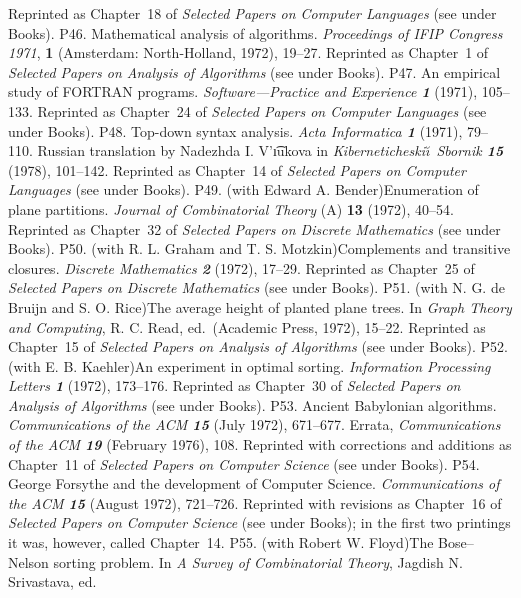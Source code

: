  Reprinted as Chapter~18 of {\sl Selected Papers on
 Computer Languages\/} (see under Books).
\p P46.  Mathematical analysis of algorithms.  {\sl Proceedings of
 IFIP Congress 1971}, {\bf 1} (Amsterdam: North-Holland, 1972), 19--27.
 Reprinted as Chapter~1 of {\sl Selected Papers on Analysis of Algorithms\/}
 (see under Books).
\p P47.  An empirical study of FORTRAN programs.  {\sl Software---Practice
 and Experience\/ \bf 1} (1971), 105--133.  
 Reprinted as Chapter~24 of {\sl Selected Papers on
 Computer Languages\/} (see under Books).
\p P48.  Top-down syntax analysis.  {\sl Acta Informatica\/ \bf 1}
 (1971), 79--110.  Russian translation by Nadezhda I. V'\t\i ukova in
 {\sl Kiberneticheski\u\i\ Sbornik\/ \bf 15} (1978), 101--142.
 Reprinted as Chapter~14 of {\sl Selected Papers on
 Computer Languages\/} (see under Books).
\p P49.  (with Edward A. Bender)\xskip  Enumeration of plane partitions.
  {\sl Journal of Combinatorial Theory\/} (A) {\bf 13} (1972), 40--54.  
 Reprinted as Chapter~32 of {\sl Selected Papers on
 Discrete Mathematics\/} (see under Books).
\p P50.  (with R. L. Graham and T. S. Motzkin)\xskip  Complements and
 transitive closures.  {\sl Discrete Mathematics\/ \bf 2} (1972), 17--29.  
 Reprinted as Chapter~25 of {\sl Selected Papers on
 Discrete Mathematics\/} (see under Books).
\p P51.  (with N. G. de Bruijn and S. O. Rice)\xskip  The average height
 of planted plane trees.  In {\sl Graph Theory and Computing}, R. C. Read,
 ed.\ (Academic Press, 1972), 15--22.  
 Reprinted as Chapter~15 of {\sl Selected Papers on Analysis of Algorithms\/}
 (see under Books).
\p P52.  (with E. B. Kaehler)\xskip  An experiment in optimal sorting.
 {\sl Information Processing Letters\/ \bf 1} (1972), 173--176.
 Reprinted as Chapter~30 of {\sl Selected Papers on Analysis of Algorithms\/}
 (see under Books).
\p P53.  Ancient Babylonian algorithms.  {\sl Commun\-i\-ca\-tions of the
 ACM\/ \bf 15} (July 1972), 671--677.
 Errata, {\sl Commun\-i\-ca\-tions of the ACM\/ \bf 19} (February 1976), 108.  
 Reprinted with corrections and additions as Chapter~11 of {\sl Selected
 Papers on Computer Science\/} (see under Books).
\p P54.  George Forsythe and the development of Computer Science. 
 {\sl Commun\-i\-ca\-tions of the ACM\/ \bf 15} (August 1972), 721--726.
 Reprinted with revisions as Chapter~16 of {\sl Selected Papers on
 Computer Science\/} (see under Books); in the first two printings
 it was, however, called Chapter~14.
\p P55.  (with Robert W. Floyd)\xskip  The Bose--Nelson sorting problem.
 In {\sl A Survey of Combinatorial Theory}, Jagdish N. Srivastava, ed.\
